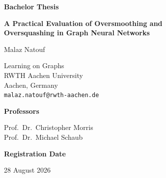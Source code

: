 \documentclass[english]{lni}
\begin{document}

\begin{titlepage}
    \thispagestyle{empty}

    \begin{center}

        \vspace*{1.5cm}

        {\Large\bfseries Bachelor Thesis\par}

        \vspace{1.4cm}

        {\LARGE\bfseries
        A Practical Evaluation of Oversmoothing and\\[0.2cm]
        Oversquashing in Graph Neural Networks
        \par}

        \vspace{1.5cm}

        {\large Malaz Natouf\par}

        \vspace{0.35cm}

        {\large
        Learning on Graphs\\
        RWTH Aachen University\\
        Aachen, Germany\\
        \texttt{malaz.natouf@rwth-aachen.de}
        \par}

        \vfill

        {\large\textbf{Professors}\par}

        \vspace{0.15cm}

        {\large
        Prof.\ Dr.\ Christopher Morris\\
        Prof.\ Dr.\ Michael Schaub
        \par}
	
	\vspace{1.95cm}
	
        {\large\textbf{Registration Date}\par}

        \vspace{0.15cm}

        {\large 28 August 2026\par}


\end{center}
\end{titlepage}
\end{document}
